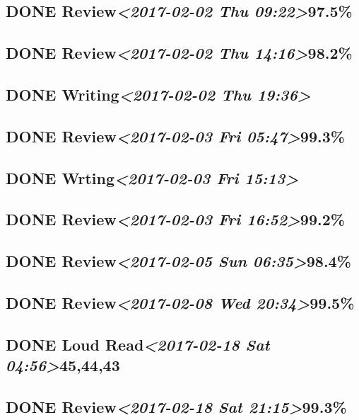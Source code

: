\documentclass[11pt]{ctexart}
\begin{document}
\subsection{{\bfseries\sffamily DONE} Review\textit{<2017-02-02 Thu 09:22>}97.5\%}
\label{sec:org2fb769b}
\subsection{{\bfseries\sffamily DONE} Review\textit{<2017-02-02 Thu 14:16>}98.2\%}
\label{sec:orgec29dc4}
\subsection{{\bfseries\sffamily DONE} Writing\textit{<2017-02-02 Thu 19:36>}}
\label{sec:org3950f69}
\subsection{{\bfseries\sffamily DONE} Review\textit{<2017-02-03 Fri 05:47>}99.3\%}
\label{sec:orgf655685}
\subsection{{\bfseries\sffamily DONE} Wrting\textit{<2017-02-03 Fri 15:13>}}
\label{sec:org97e1f8e}
\subsection{{\bfseries\sffamily DONE} Review\textit{<2017-02-03 Fri 16:52>}99.2\%}
\label{sec:org56bb586}
\subsection{{\bfseries\sffamily DONE} Review\textit{<2017-02-05 Sun 06:35>}98.4\%}
\label{sec:orgd14d830}
\subsection{{\bfseries\sffamily DONE} Review\textit{<2017-02-08 Wed 20:34>}99.5\%}
\label{sec:orgdd0cd05}
\subsection{{\bfseries\sffamily DONE} Loud Read\textit{<2017-02-18 Sat 04:56>}45,44,43}
\label{sec:orgb94dac7}
\subsection{{\bfseries\sffamily DONE} Review\textit{<2017-02-18 Sat 21:15>}99.3\%}
\label{sec:org2f1590e}
\end{document}
